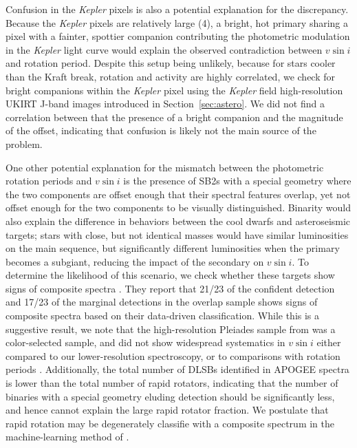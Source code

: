 \documentclass[manuscript]{aastex6}
\newcommand{\vsini}{\ensuremath{v \sin i}}
\newcommand{\Kepler}{\mbox{\textit{Kepler}}}
\begin{document}
Confusion in the \Kepler{} pixels is also a potential explanation for the
discrepancy. Because the \Kepler{} pixels are relatively large (4\arcsec), a 
bright, hot primary sharing a pixel with a fainter, spottier companion 
contributing the photometric modulation in the
\Kepler{} light curve would explain the observed contradiction between
\vsini{} and rotation period. Despite this setup being unlikely, because for 
stars cooler than the Kraft break, rotation and activity are highly 
correlated, we check for bright companions
within the \Kepler{} pixel using the \Kepler{} field high-resolution UKIRT
J-band images introduced in Section~\ref{sec:astero}. We did not find a 
correlation between that the presence of a bright companion and the magnitude 
of the offset, indicating that confusion is likely not the main source of the 
problem.

One other potential explanation for the mismatch between the photometric
rotation periods and \vsini{} is the presence of SB2s with a special geometry
where the two components are offset enough that their spectral features
overlap, yet not offset enough for the two components to be visually
distinguished. Binarity would also explain the difference in behaviors
between the cool dwarfs and asteroseismic targets; stars with close, but
not identical masses would have similar luminosities on the main
sequence, but significantly different luminosities when the primary
becomes a subgiant, reducing the impact of the secondary on
\vsini{}. To determine the likelihood of this scenario, we check whether
these targets show signs of composite spectra \citep{ElBadry18}. They
report that 21/23 of the confident detection and 17/23 of the marginal detections
in the overlap sample shows signs of composite spectra based on their
data-driven classification. While this is a suggestive result, we note
that the high-resolution Pleiades sample from
\citet{Stauffer87} was a color-selected sample, and did not show widespread
systematics in \vsini{} either compared to our
lower-resolution spectroscopy, or to comparisons with rotation periods
\citep{Jackson10}. Additionally, the total
number of DLSBs identified in APOGEE spectra is lower than the total
number of rapid rotators, indicating that the number of binaries with a
special geometry eluding detection should be significantly less, and
hence cannot explain the large rapid rotator fraction. We postulate that
rapid rotation may be degenerately classifie with a composite spectrum
in the machine-learning method of \citet{ElBadry18}.
\end{document}
